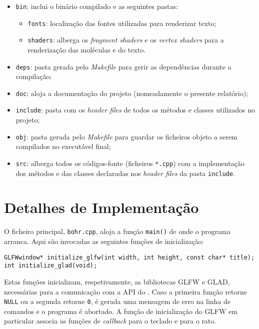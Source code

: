 \begin{itemize}
    \item \verb|bin|: inclui o binário compilado e as seguintes pastas:
    \begin{itemize}[nosep]
        \item \verb|fonts|: localização das fontes utilizadas para renderizar texto;
        \item \verb|shaders|: alberga os \textit{fragment shaders} e os \textit{vertex shaders} para a renderização das moléculas e do texto.
    \end{itemize}
    \item \verb|deps|: pasta gerada pelo \textit{Makefile} para gerir as dependências durante a compilação;
    \item \verb|doc|: aloja a documentação do projeto (nomeadamente o presente relatório);
    \item \verb|include|: pasta com os \textit{header files} de todos os métodos e classes utilizados no projeto;
    \item \verb|obj|: pasta gerada pelo \textit{Makefile} para guardar os ficheiros objeto a serem compilados no executável final;
    \item \verb|src|: alberga todos os códigos-fonte (ficheiros \verb|*.cpp|) com a implementação dos métodos e das classes declaradas nos \textit{header files} da pasta \verb|include|.
\end{itemize}


\section{Detalhes de Implementação}
\label{sec::implement:detalhes}

O ficheiro principal, \verb|bohr.cpp|, aloja a função \verb|main()| de onde o programa arranca. Aqui são invocadas as seguintes funções de inicialização:

\begin{verbatim}
GLFWwindow* initialize_glfw(int width, int height, const char* title);
int initialize_glad(void);
\end{verbatim}

Estas funções inicializam, respetivamente, as bibliotecas GLFW e GLAD, necessárias para a comunicação com a \ac{API} do \opengl. Caso a primeira função retorne \verb|NULL| ou a segunda retorne \verb|0|, é gerada uma mensagem de erro na linha de comandos e o programa é abortado. A função de inicialização do GLFW em particular associa as funções de \textit{callback} para o teclado e para o rato.

